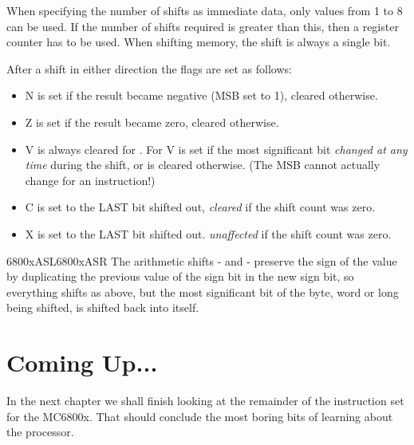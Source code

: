 When specifying the number of shifts as immediate data, only values
    from 1 to 8 can be used. If the number of shifts required is greater than
    this, then a register counter has to be used. When shifting memory, the
    shift is always a single bit.

After a shift in either direction the flags are set as follows:

\begin{itemize}[itemsep=0pt]

\item{}N is set if the result became negative (MSB set to 1), cleared
        otherwise.


\item{}Z is set if the result became zero, cleared otherwise.


\item{}V is always cleared for . For  V is set 
        if the most significant bit \emph{changed at any time} during the shift,
        or is cleared otherwise. (The MSB cannot actually change for an  
        instruction!)


\item{}C is set to the LAST bit shifted out, \emph{cleared} if the shift count
        was zero.


\item{}X is set to the LAST bit shifted out. \emph{unaffected} if the shift
        count was zero.

\end{itemize}
\mc6800x{ASL}\mc6800x{ASR}
The arithmetic shifts -{}  and  -{} preserve the sign of the 
    value by duplicating the previous value of the sign bit in the new sign bit, so
    everything shifts as above, but the most significant bit of the byte, word
    or long being shifted, is shifted back into itself.

\section{Coming Up...}
\label{ch4-the-end}%

In the next chapter we shall finish looking at the remainder of the
    instruction set for the MC6800x. That should conclude the most boring
    bits of learning about the processor.
